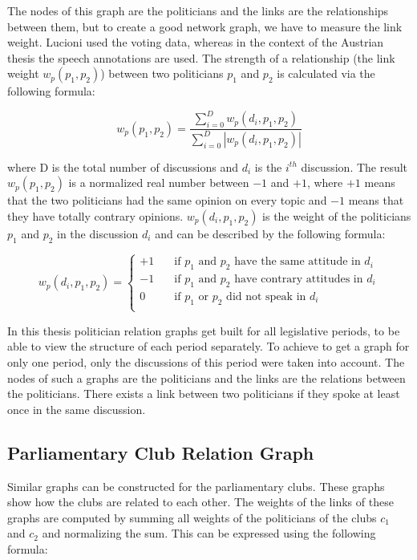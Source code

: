 The nodes of this graph are the politicians and the links are the relationships between them, but to create a good network graph, we have to measure the link weight. Lucioni \cite{Lucioni_2015} used the voting data, whereas in the context of the Austrian thesis the speech annotations are used. The strength of a relationship (the link weight $w_p(p_1,p_2)$) between two politicians $p_1$ and $p_2$ is calculated via the following formula:

$$w_p(p_1,p_2) = \frac{\displaystyle\sum_{i=0}^{D} w_p(d_i,p_1,p_2)}{\displaystyle\sum_{i=0}^{D} |w_p(d_i,p_1,p_2)|}$$

where D is the total number of discussions and $d_i$ is the $i^{th}$ discussion. The result $w_p(p_1,p_2)$ is a normalized real number between $-1$ and $+1$, where $+1$ means that the two politicians had the same opinion on every topic and $-1$ means that they have totally contrary opinions. $w_p(d_i,p_1,p_2)$ is the weight of the politicians $p_1$ and $p_2$ in the discussion $d_i$ and can be described by the following formula:

$$w_p(d_i,p_1,p_2) = 
\begin{cases}
    +1       & \quad \text{if } p_1 \text{ and } p_2 \text{ have the same attitude in } d_i\\
    -1  & \quad \text{if } p_1 \text{ and } p_2 \text{ have contrary attitudes in } d_i\\
        0       & \quad \text{if } p_1 \text{ or } p_2 \text{ did not speak in } d_i\\
\end{cases}
$$

In this thesis politician relation graphs get built for all legislative periods, to be able to view the structure of each period separately. To achieve to get a graph for only one period, only the discussions of this period were taken into account. The nodes of such a graphs are the politicians and the links are the relations between the politicians. There exists a link between two politicians if they spoke at least once in the same discussion.

\subsection{Parliamentary Club Relation Graph}
\label{sec:club_relation_graph}
Similar graphs can be constructed for the parliamentary clubs. These graphs show how the clubs are related to each other. The weights of the links of these graphs are computed by summing all weights of the politicians of the clubs $c_1$ and $c_2$ and normalizing the sum. This can be expressed using the following formula:

